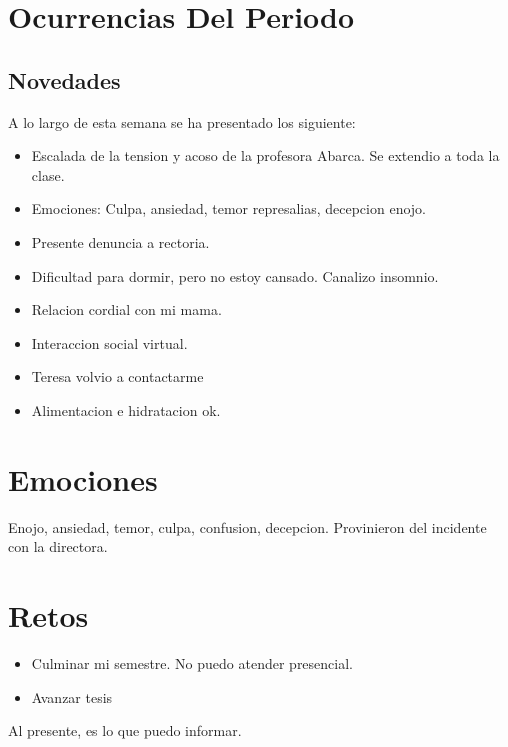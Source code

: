 \documentclass[a4paper,12pt]{article}
\begin{document}



\section*{Ocurrencias Del Periodo}

\subsection{Novedades}
A lo largo de esta semana se ha presentado los siguiente:

\begin{itemize}
  \item Escalada de la tension y acoso de la profesora Abarca. Se extendio a toda la clase.
  \item Emociones: Culpa, ansiedad, temor  represalias, decepcion enojo.
\item Presente denuncia a rectoria.
\item Dificultad para dormir, pero no estoy cansado. Canalizo insomnio.
\item Relacion cordial con mi mama.
\item Interaccion social virtual.
\item Teresa volvio a contactarme
\item Alimentacion e hidratacion ok.
\end{itemize}

\section*{Emociones}
Enojo, ansiedad, temor, culpa, confusion, decepcion. Provinieron del incidente con la directora.


\section*{Retos}
\begin{itemize}
\item Culminar mi semestre. No puedo atender presencial.
\item Avanzar tesis
\end{itemize}

Al presente, es lo que puedo informar.
\end{document}
